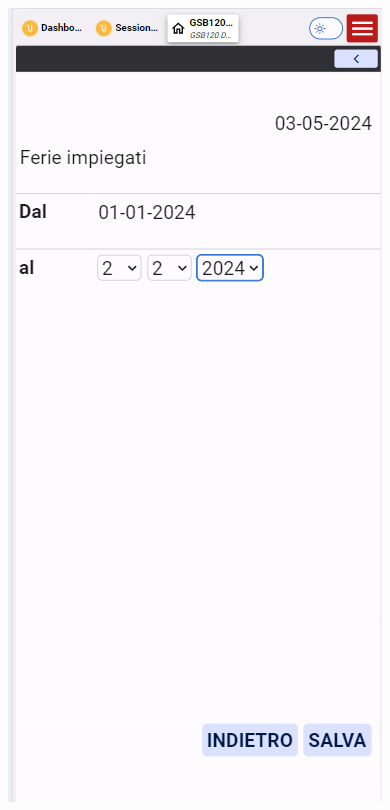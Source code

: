 \documentclass[target=bach,aauheader=,style=]{thud}
\begin{document}
\begin{figure}[H]
    \centering
    \begin{minipage}{0.25\textwidth}
        \centering
        \includegraphics[width=\linewidth]{screenshot/Mobile GSA084 Ferie.png}

\end{minipage}
\end{figure}
\end{document}
